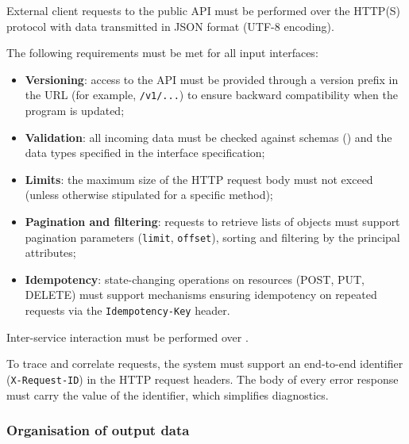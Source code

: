 \documentclass[12pt,a4paper]{extarticle}
\begin{document}
\begin{hseExample}
External client requests to the public API must be performed over the HTTP(S) protocol with data transmitted in JSON format (UTF-8 encoding).

The following requirements must be met for all input interfaces:
\begin{itemize}[nosep, leftmargin=1.25cm]
    \item \textbf{Versioning}: access to the API must be provided through a version prefix in the URL (for example, \texttt{/v1/...}) to ensure backward compatibility when the program is updated;
    \item \textbf{Validation}: all incoming data must be checked against schemas () and the data types specified in the interface specification;
    \item \textbf{Limits}: the maximum size of the HTTP request body must not exceed  (unless otherwise stipulated for a specific method);
    \item \textbf{Pagination and filtering}: requests to retrieve lists of objects must support pagination parameters (\texttt{limit}, \texttt{offset}), sorting and filtering by the principal attributes;
    \item \textbf{Idempotency}: state-changing operations on resources (POST, PUT, DELETE) must support mechanisms ensuring idempotency on repeated requests via the \texttt{Idempotency-Key} header.
\end{itemize}

Inter-service interaction must be performed over .

To trace and correlate requests, the system must support an end-to-end identifier (\texttt{X-Request-ID}) in the HTTP request headers. The body of every error response must carry the value of the identifier, which simplifies diagnostics.
\end{hseExample}

\subsubsection{Organisation of output data}
\label{sec:output_data}
\end{document}

